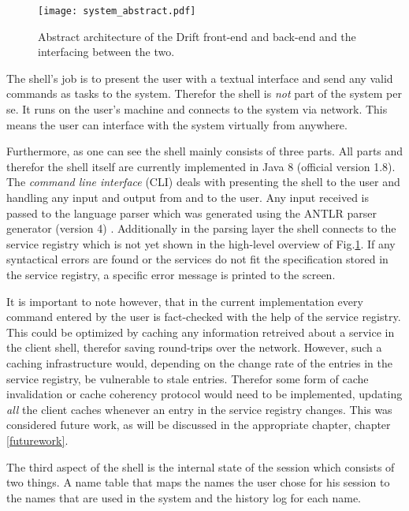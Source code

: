 \begin{figure}[h]
  \texttt{[image: system\_abstract.pdf]}
  \caption{Abstract architecture of the Drift front-end and back-end
           and the interfacing between the two.}
  \label{system-abstract}
\end{figure}

The shell's job is to present the user with a textual interface
and send any valid commands as tasks to the system. Therefor
the shell is \textit{not} part of the system per se. It runs
on the user's machine and connects to the system via network.
This means the user can interface with the system virtually from
anywhere.

Furthermore, as one can see the shell mainly consists of three parts.
All parts and therefor the shell itself are currently implemented
in Java 8 (official version 1.8).
The \textit{command line interface} (CLI) deals with presenting
the shell to the user and handling any input and output from
and to the user. Any input received is passed to the
language parser which was generated using the ANTLR parser
generator (version 4) \cite{antlr}. Additionally in the
parsing layer the shell connects to the service registry which
is not yet shown in the high-level overview of Fig.\ref{system-abstract}.
If any syntactical errors are found or the services do not fit
the specification stored in the service registry, a specific error
message is printed to the screen.

It is important to note however, that in the current implementation
every command entered by the user is fact-checked with the help
of the service registry. This could be optimized by caching any
information retreived about a service in the client shell, therefor
saving round-trips over the network. However, such a caching
infrastructure would, depending on the change rate of the entries
in the service registry, be vulnerable to stale entries. Therefor
some form of cache invalidation or cache coherency protocol would
need to be implemented, updating \textit{all} the client caches
whenever an entry in the service registry changes.
This was considered future work, as will be discussed in the
appropriate chapter, chapter \ref{futurework}.

The third aspect of the shell is the internal state of the session
which consists of two things. A name table that maps the names the
user chose for his session to the names that are used in the system
and the history log for each name.
